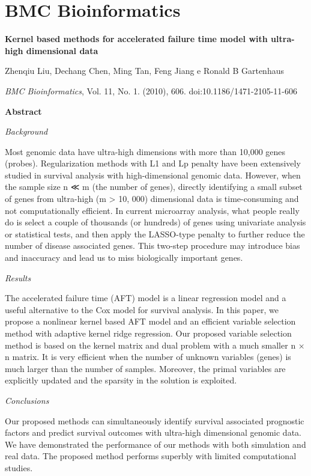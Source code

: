 \chapter{BMC Bioinformatics}

{\Large \bf Kernel based methods for accelerated failure time model with ultra-high dimensional data}

Zhenqiu Liu, Dechang Chen, Ming Tan, Feng Jiang e Ronald B Gartenhaus

{\it BMC Bioinformatics}, Vol. 11, No. 1. (2010), 606. doi:10.1186/1471-2105-11-606

{\large \bf Abstract}

{\it Background}

Most genomic data have ultra-high dimensions with more than 10,000 genes (probes). Regularization methods with L1 and Lp penalty have been extensively studied in survival analysis with high-dimensional genomic data. However, when the sample size n ≪ m (the number of genes), directly identifying a small subset of genes from ultra-high (m > 10, 000) dimensional data is time-consuming and not computationally efficient. In current microarray analysis, what people really do is select a couple of thousands (or hundreds) of genes using univariate analysis or statistical tests, and then apply the LASSO-type penalty to further reduce the number of disease associated genes. This two-step procedure may introduce bias and inaccuracy and lead us to miss biologically important genes.

{\it Results}

The accelerated failure time (AFT) model is a linear regression model and a useful alternative to the Cox model for survival analysis. In this paper, we propose a nonlinear kernel based AFT model and an efficient variable selection method with adaptive kernel ridge regression. Our proposed variable selection method is based on the kernel matrix and dual problem with a much smaller n × n matrix. It is very efficient when the number of unknown variables (genes) is much larger than the number of samples. Moreover, the primal variables are explicitly updated and the sparsity in the solution is exploited.

{\it Conclusions}

Our proposed methods can simultaneously identify survival associated prognostic factors and predict survival outcomes with ultra-high dimensional genomic data. We have demonstrated the performance of our methods with both simulation and real data. The proposed method performs superbly with limited computational studies.


